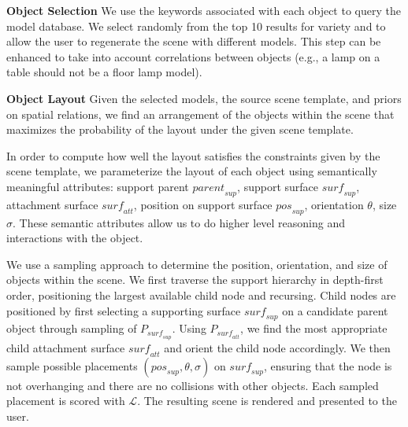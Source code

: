 \documentclass{sigchi}
\begin{document}
\textbf{Object Selection}
We use the keywords associated with each object to query the model database.  We select randomly from the top 10 results for variety and to allow the user to regenerate the scene with different models.  This step can be enhanced to take into account correlations between objects (e.g., a lamp on a table should not be a floor lamp model).

\textbf{Object Layout}
Given the selected models, the source scene template, and priors on spatial relations, we find an arrangement of the objects within the scene that maximizes the probability of the layout under the given scene template.

In order to compute how well the layout satisfies the constraints given by the scene template, we parameterize the layout of each object using semantically meaningful attributes: support parent $\textit{parent}_{sup}$, support surface $\textit{surf}_\textit{sup}$, attachment surface $\textit{surf}_\textit{att}$, position on support surface $\textit{pos}_\textit{sup}$, orientation $\theta$, size $\sigma$. These semantic attributes allow us to do higher level reasoning and interactions with the object.


We use a sampling approach to determine the position, orientation, and size of objects within the scene.  We first traverse the support hierarchy in depth-first order, positioning the largest available child node and recursing.  Child nodes are positioned by first selecting a supporting surface $\textit{surf}_\textit{sup}$ on a candidate parent object through sampling of $P_{\textit{surf}_\textit{sup}}$.  Using $P_{\textit{surf}_\textit{att}}$, we find the most appropriate child attachment surface $\textit{surf}_\textit{att}$ and orient the child node accordingly.  We then sample possible placements $(\textit{pos}_\textit{sup}, \theta, \sigma)$ on $\textit{surf}_\textit{sup}$, ensuring that the node is not overhanging and there are no collisions with other objects.  Each sampled placement is scored with $\mathcal{L}$. The resulting scene is rendered and presented to the user.

\end{document}

